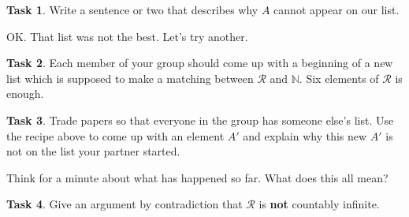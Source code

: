 \documentclass[12pt]{amsart}
\theoremstyle{definition}
\newtheorem{task}{Task}
\begin{document}
\begin{task}
Write a sentence or two that describes why $A$ cannot appear on our list.
\end{task}

OK. That list was not the best. Let's try another.

\begin{task}
Each member of your group should come up with a beginning of a new list which is supposed to make a matching between $\mathcal{R}$ and $\mathbb{N}$.
Six elements of $\mathcal{R}$ is enough.
\end{task}

\begin{task}
Trade papers so that everyone in the group has someone else's list.
Use the recipe above to come up with an element $A'$ and explain why this new $A'$ is not on the list your partner started.
\end{task}

Think for a minute about what has happened so far.
What does this all mean?

\begin{task}
Give an argument by contradiction that $\mathcal{R}$ is \textbf{not} countably infinite.
\end{task}
\end{document}
